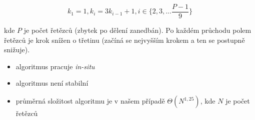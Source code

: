 $$k_{1} = 1, k_{i} = 3k_{i-1}+1, i \in \lbrace2,3,...\frac{P-1}{9}\rbrace$$

kde $P$ je počet řetězců (zbytek po dělení zanedbán). Po každém průchodu polem řetězců je krok snížen o třetinu (začíná se nejvyšším krokem a ten se postupně snižuje).

\begin{itemize}
	\item algoritmus pracuje \textit{in-situ}
	\item algoritmus není stabilní
	\item průměrná složitost algoritmu je v našem případě $\Theta(N^{1,25})$, kde $N$ je počet řetězců
\end{itemize}

